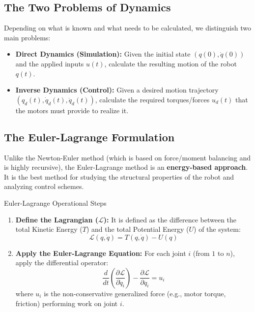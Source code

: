 \documentclass[11pt,a4paper]{article}
\begin{document}
\subsection{The Two Problems of Dynamics}
Depending on what is known and what needs to be calculated, we distinguish two main problems:
\begin{itemize}
    \item \textbf{Direct Dynamics (Simulation):} Given the initial state $(q(0), \dot{q}(0))$ and the applied inputs $u(t)$, calculate the resulting motion of the robot $q(t)$.
    \item \textbf{Inverse Dynamics (Control):} Given a desired motion trajectory $(q_d(t), \dot{q}_d(t), \ddot{q}_d(t))$, calculate the required torques/forces $u_d(t)$ that the motors must provide to realize it.
\end{itemize}

\subsection{The Euler-Lagrange Formulation}
Unlike the Newton-Euler method (which is based on force/moment balancing and is highly recursive), the Euler-Lagrange method is an \textbf{energy-based approach}. It is the best method for studying the structural properties of the robot and analyzing control schemes.

\begin{theorybox}{Euler-Lagrange Operational Steps}
\begin{enumerate}
    \item \textbf{Define the Lagrangian ($\mathcal{L}$):} It is defined as the difference between the total Kinetic Energy ($T$) and the total Potential Energy ($U$) of the system:
    \begin{equation}
        \mathcal{L}(q, \dot{q}) = T(q, \dot{q}) - U(q)
    \end{equation}
    
    \item \textbf{Apply the Euler-Lagrange Equation:} For each joint $i$ (from $1$ to $n$), apply the differential operator:
    \begin{equation}
        \frac{d}{dt}\left(\frac{\partial \mathcal{L}}{\partial \dot{q}_i}\right) - \frac{\partial \mathcal{L}}{\partial q_i} = u_i
    \end{equation}
    where $u_i$ is the non-conservative generalized force (e.g., motor torque, friction) performing work on joint $i$.
\end{enumerate}
\end{theorybox}
\end{document}
